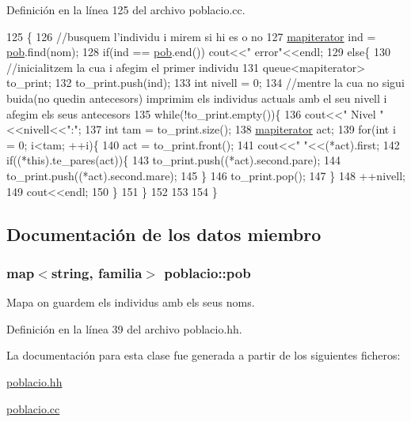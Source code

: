 Definición en la línea 125 del archivo poblacio.\+cc.


\begin{DoxyCode}
125                                                   \{
126   \textcolor{comment}{//busquem l'individu i mirem si hi es o no}
127   \hyperlink{classpoblacio_a52c3d96b08f7679f27487e7499185ed1}{mapiterator} ind = \hyperlink{classpoblacio_a7ecb70033b151a937143b07d489c4c17}{pob}.find(nom);
128   \textcolor{keywordflow}{if}(ind == \hyperlink{classpoblacio_a7ecb70033b151a937143b07d489c4c17}{pob}.end()) cout<<\textcolor{stringliteral}{"  error"}<<endl;
129   \textcolor{keywordflow}{else}\{
130     \textcolor{comment}{//inicialitzem la cua i afegim el primer individu}
131   queue<mapiterator> to\_print;
132   to\_print.push(ind);
133   \textcolor{keywordtype}{int} nivell = 0;
134   \textcolor{comment}{//mentre la cua no sigui buida(no quedin antecesors) imprimim els individus actuals amb el seu nivell i
       afegim els seus antecesors}
135   \textcolor{keywordflow}{while}(!to\_print.empty())\{
136     cout<<\textcolor{stringliteral}{"  Nivel "}<<nivell<<\textcolor{stringliteral}{":"};
137     \textcolor{keywordtype}{int} tam  = to\_print.size();
138     \hyperlink{classpoblacio_a52c3d96b08f7679f27487e7499185ed1}{mapiterator} act;
139     \textcolor{keywordflow}{for}(\textcolor{keywordtype}{int} i = 0; i<tam; ++i)\{
140       act = to\_print.front();
141       cout<<\textcolor{stringliteral}{" "}<<(*act).first;
142       \textcolor{keywordflow}{if}((*this).te\_pares(act))\{
143         to\_print.push((*act).second.pare);
144         to\_print.push((*act).second.mare);
145       \}
146       to\_print.pop();
147     \}
148     ++nivell;
149     cout<<endl;
150   \}
151   \}
152 
153 
154 \}
\end{DoxyCode}


\subsection{Documentación de los datos miembro}
\subsubsection[{\texorpdfstring{pob}{pob}}]{\setlength{\rightskip}{0pt plus 5cm}map$<$string, {\bf familia}$>$ poblacio\+::pob\hspace{0.3cm}{\ttfamily [private]}}\hypertarget{classpoblacio_a7ecb70033b151a937143b07d489c4c17}{}\label{classpoblacio_a7ecb70033b151a937143b07d489c4c17}


Mapa on guardem els individus amb els seus noms. 



Definición en la línea 39 del archivo poblacio.\+hh.



La documentación para esta clase fue generada a partir de los siguientes ficheros\+:\begin{DoxyCompactItemize}
\item 
\hyperlink{poblacio_8hh}{poblacio.\+hh}\item 
\hyperlink{poblacio_8cc}{poblacio.\+cc}\end{DoxyCompactItemize}
